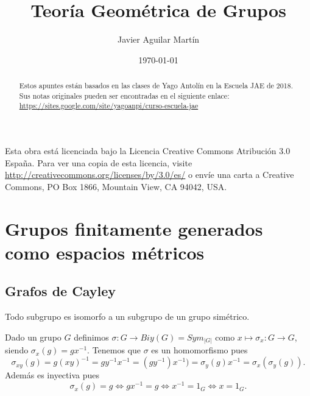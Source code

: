 \documentclass[twoside, 11pt]{article}
\begin{document}

\author{Javier Aguilar Martín }
\date{\today}
\title{Teoría Geométrica de Grupos}

\maketitle


\begin{abstract}
Estos apuntes están basados en las clases de Yago Antolín en la Escuela JAE de 2018. Sus notas originales pueden ser encontradas en el siguiente enlace: \url{https://sites.google.com/site/yagoanpi/curso-escuela-jae}
\end{abstract}


	\vfill
	Esta obra está licenciada bajo la Licencia Creative Commons Atribución 3.0 España. Para ver una copia de esta licencia, visite \url{http://creativecommons.org/licenses/by/3.0/es/} o envíe una carta a Creative Commons, PO Box 1866, Mountain View, CA 94042, USA.


\newpage
\tableofcontents

\newpage

\section{Grupos finitamente generados como espacios métricos}
\subsection{Grafos de Cayley}
\begin{teorema}[Cayley]
Todo subgrupo es isomorfo a un subgrupo de un grupo simétrico.
\end{teorema}
\begin{dem}
Dado un grupo $G$ definimos $\sigma:G\to Biy(G)=Sym_{|G|}$ como $x\mapsto \sigma_x:G\to G$, siendo $\sigma_x(g)=gx^{-1}$. Tenemos que $\sigma$ es un homomorfismo pues
$$
\sigma_{xy}(g)=g(xy)^{-1}=gy^{-1}x^{-1}=(gy^{-1})x^{-1})=\sigma_y(g)x^{-1}=\sigma_x(\sigma_y(g)).
$$
Además es inyectiva pues 
$$
\sigma_x(g)=g\Leftrightarrow gx^{-1}=g\Leftrightarrow x^{-1}=1_G\Leftrightarrow x=1_G.
$$
\QED
\end{dem}
\end{document}
